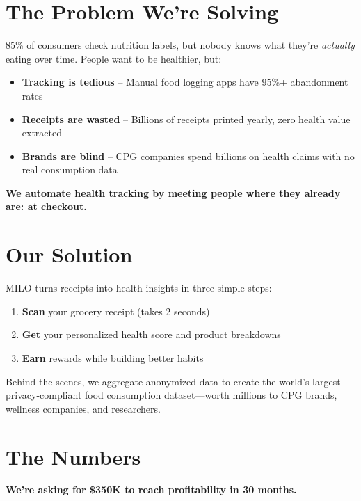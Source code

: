 \documentclass[11pt,a4paper]{report}
\begin{document}
\section{The Problem We're Solving}

85\% of consumers check nutrition labels, but nobody knows what they're \textit{actually} eating over time. People want to be healthier, but:

\begin{itemize}[leftmargin=2em, itemsep=4pt]
    \item \textbf{Tracking is tedious} -- Manual food logging apps have 95\%+ abandonment rates
    \item \textbf{Receipts are wasted} -- Billions of receipts printed yearly, zero health value extracted
    \item \textbf{Brands are blind} -- CPG companies spend billions on health claims with no real consumption data
\end{itemize}

\textbf{We automate health tracking by meeting people where they already are: at checkout.}

\section{Our Solution}

MILO turns receipts into health insights in three simple steps:

\begin{enumerate}[leftmargin=2em, itemsep=4pt]
    \item \textbf{Scan} your grocery receipt (takes 2 seconds)
    \item \textbf{Get} your personalized health score and product breakdowns
    \item \textbf{Earn} rewards while building better habits
\end{enumerate}

Behind the scenes, we aggregate anonymized data to create the world's largest privacy-compliant food consumption dataset---worth millions to CPG brands, wellness companies, and researchers.

\section{The Numbers}

\textbf{We're asking for \$350K to reach profitability in 30 months.}

\vspace{0.5cm}
\end{document}
